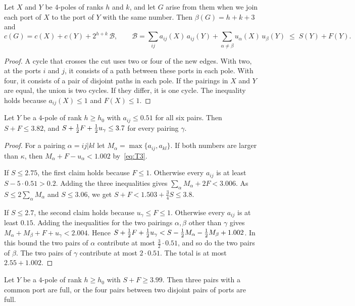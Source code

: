 \begin{lemma}[Gluing]\label{lem:glue4}
Let $X$ and $Y$ be $4$-poles of ranks $h$ and $k$, and let $G$ arise from them when we join each
port of $X$ to the port of $Y$ with the same number. Then $\beta(G)=h+k+3$ and
\[
  c(G)=c(X)+c(Y)+2^{h+k}\,\mathcal B,\qquad
  \mathcal B=\sum_{ij}a_{ij}(X)\,a_{ij}(Y)+\sum_{\alpha\ne\beta}u_\alpha(X)\,u_\beta(Y)
  \;\le\;S(Y)+F(Y).
\]
\end{lemma}

\begin{proof}
A cycle that crosses the cut uses two or four of the new edges. With two, at the ports $i$ and $j$,
it consists of a path between these ports in each pole. With four, it consists of a pair of
disjoint paths in each pole. If the pairings in $X$ and $Y$ are equal, the union is two cycles. If
they differ, it is one cycle. The inequality holds because $a_{ij}(X)\le1$ and $F(X)\le1$.
\end{proof}

\begin{lemma}\label{lem:low}
Let $Y$ be a $4$-pole of rank $h\ge h_0$ with $a_{ij}\le0.51$ for all six pairs. Then
$S+F\le3.82$, and $S+\tfrac12 F+\tfrac12 u_\gamma\le3.7$ for every pairing $\gamma$.
\end{lemma}

\begin{proof}
For a pairing $\alpha=ij|kl$ let $M_\alpha=\max\{a_{ij},a_{kl}\}$. If both numbers are larger than
$\kappa$, then $M_\alpha+F-u_\alpha<1.002$ by~\eqref{eq:T3}.

If $S\le2.75$, the first claim holds because $F\le1$. Otherwise every $a_{ij}$ is at least
$S-5\cdot0.51>0.2$. Adding the three inequalities gives $\sum_\alpha M_\alpha+2F<3.006$. As
$S\le2\sum_\alpha M_\alpha$ and $S\le3.06$, we get $S+F<1.503+\frac34S\le3.8$.

If $S\le2.7$, the second claim holds because $u_\gamma\le F\le1$. Otherwise every $a_{ij}$ is at
least $0.15$. Adding the inequalities for the two pairings $\alpha,\beta$ other than $\gamma$ gives
$M_\alpha+M_\beta+F+u_\gamma<2.004$. Hence
$S+\tfrac12 F+\tfrac12 u_\gamma<S-\tfrac12 M_\alpha-\tfrac12 M_\beta+1.002$. In this bound the two pairs of
$\alpha$ contribute at most $\frac32\cdot0.51$, and so do the two pairs of $\beta$. The two pairs
of $\gamma$ contribute at most $2\cdot0.51$. The total is at most $2.55+1.002$.
\end{proof}

\begin{lemma}[Rigidity]\label{lem:rigid}
Let $Y$ be a $4$-pole of rank $h\ge h_0$ with $S+F\ge3.99$. Then three pairs with a common port
are full, or the four pairs between two disjoint pairs of ports are full.
\end{lemma}

